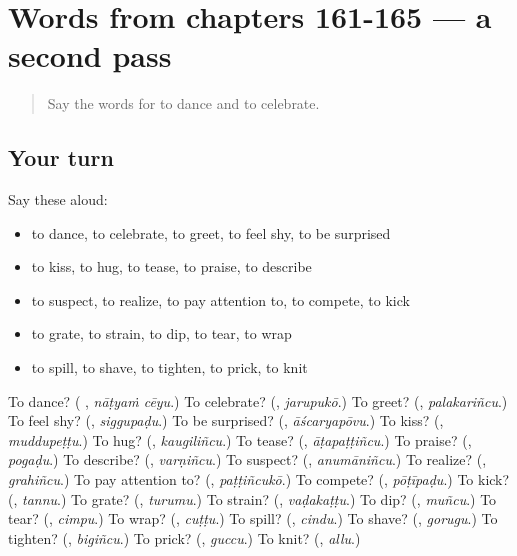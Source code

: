 \section[(dialogue)]{Words from chapters 161-165 — a second pass}

\label{lesson:TE-R165-second-pass-words-from-chapters-161-165}



\begin{quote}
Say the words for to dance and to celebrate.
\end{quote}

\subsection*{Your turn}
Say these aloud:

\begin{itemize}
\raggedright
  \item to dance, to celebrate, to greet, to feel shy, to be surprised
  \item to kiss, to hug, to tease, to praise, to describe
  \item to suspect, to realize, to pay attention to, to compete, to kick
  \item to grate, to strain, to dip, to tear, to wrap
  \item to spill, to shave, to tighten, to prick, to knit
\end{itemize}

\begin{tcolorbox}[breakable,colback=teal!4,colframe=teal!35!black,title={Before you move on}]
To dance? (\textbf{ }, \emph{nāṭyaṁ cēyu}.) To celebrate? (\textbf{}, \emph{jarupukō}.) To greet? (\textbf{}, \emph{palakariñcu}.) To feel shy? (\textbf{}, \emph{siggupaḍu}.) To be surprised? (\textbf{}, \emph{āścaryapōvu}.) To kiss? (\textbf{}, \emph{muddupeṭṭu}.) To hug? (\textbf{}, \emph{kaugiliñcu}.) To tease? (\textbf{}, \emph{āṭapaṭṭiñcu}.) To praise? (\textbf{}, \emph{pogaḍu}.) To describe? (\textbf{}, \emph{varṇiñcu}.) To suspect? (\textbf{}, \emph{anumāniñcu}.) To realize? (\textbf{}, \emph{grahiñcu}.) To pay attention to? (\textbf{}, \emph{paṭṭiñcukō}.) To compete? (\textbf{}, \emph{pōṭīpaḍu}.) To kick? (\textbf{}, \emph{tannu}.) To grate? (\textbf{}, \emph{turumu}.) To strain? (\textbf{}, \emph{vaḍakaṭṭu}.) To dip? (\textbf{}, \emph{muñcu}.) To tear? (\textbf{}, \emph{cimpu}.) To wrap? (\textbf{}, \emph{cuṭṭu}.) To spill? (\textbf{}, \emph{cindu}.) To shave? (\textbf{}, \emph{gorugu}.) To tighten? (\textbf{}, \emph{bigiñcu}.) To prick? (\textbf{}, \emph{guccu}.) To knit? (\textbf{}, \emph{allu}.)
\end{tcolorbox}
